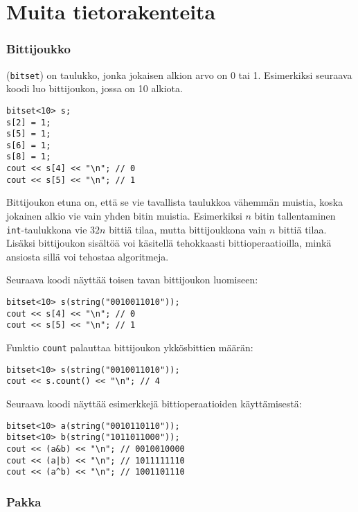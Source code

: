 \section{Muita tietorakenteita}

\subsubsection{Bittijoukko}


 (\texttt{bitset}) on taulukko,
jonka jokaisen alkion arvo on 0 tai 1.
Esimerkiksi
seuraava koodi luo bittijoukon, jossa on 10 alkiota.
\begin{lstlisting}
bitset<10> s;
s[2] = 1;
s[5] = 1;
s[6] = 1;
s[8] = 1;
cout << s[4] << "\n"; // 0
cout << s[5] << "\n"; // 1
\end{lstlisting}

Bittijoukon etuna on, että se vie tavallista
taulukkoa vähemmän muistia,
koska jokainen alkio vie
vain yhden bitin muistia.
Esimerkiksi $n$ bitin tallentaminen
\texttt{int}-taulukkona vie $32n$
bittiä tilaa, mutta bittijoukkona
vain $n$ bittiä tilaa.
Lisäksi bittijoukon sisältöä
voi käsitellä tehokkaasti bittioperaatioilla,
minkä ansiosta sillä voi tehostaa algoritmeja.

Seuraava koodi näyttää toisen tavan
bittijoukon luomiseen:

\begin{lstlisting}
bitset<10> s(string("0010011010"));
cout << s[4] << "\n"; // 0
cout << s[5] << "\n"; // 1
\end{lstlisting}

Funktio \texttt{count} palauttaa
bittijoukon ykkösbittien määrän:

\begin{lstlisting}
bitset<10> s(string("0010011010"));
cout << s.count() << "\n"; // 4
\end{lstlisting}

Seuraava koodi näyttää esimerkkejä
bittioperaatioiden käyttämisestä:
\begin{lstlisting}
bitset<10> a(string("0010110110"));
bitset<10> b(string("1011011000"));
cout << (a&b) << "\n"; // 0010010000
cout << (a|b) << "\n"; // 1011111110
cout << (a^b) << "\n"; // 1001101110
\end{lstlisting}

\subsubsection{Pakka}

